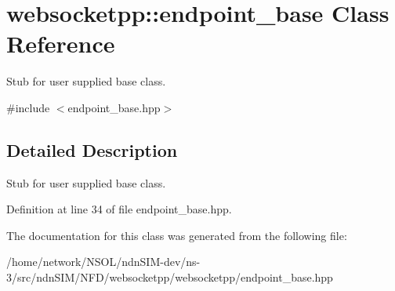 \hypertarget{classwebsocketpp_1_1endpoint__base}{}\section{websocketpp\+:\+:endpoint\+\_\+base Class Reference}
\label{classwebsocketpp_1_1endpoint__base}


Stub for user supplied base class.  




{\ttfamily \#include $<$endpoint\+\_\+base.\+hpp$>$}



\subsection{Detailed Description}
Stub for user supplied base class. 

Definition at line 34 of file endpoint\+\_\+base.\+hpp.



The documentation for this class was generated from the following file\+:\begin{DoxyCompactItemize}
\item 
/home/network/\+N\+S\+O\+L/ndn\+S\+I\+M-\/dev/ns-\/3/src/ndn\+S\+I\+M/\+N\+F\+D/websocketpp/websocketpp/endpoint\+\_\+base.\+hpp\end{DoxyCompactItemize}
